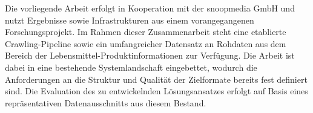 Die vorliegende Arbeit erfolgt in Kooperation mit der snoopmedia GmbH und nutzt Ergebnisse sowie Infrastrukturen aus einem vorangegangenen Forschungsprojekt. Im Rahmen dieser 
Zusammenarbeit steht eine etablierte Crawling-Pipeline sowie ein umfangreicher Datensatz an Rohdaten aus dem Bereich der Lebensmittel-Produktinformationen zur Verfügung. Die Arbeit 
ist dabei in eine bestehende Systemlandschaft eingebettet, wodurch die Anforderungen an die Struktur und Qualität der Zielformate bereits fest definiert sind. Die Evaluation des zu
 entwickelnden Lösungsansatzes erfolgt auf Basis eines repräsentativen Datenausschnitts aus diesem Bestand.